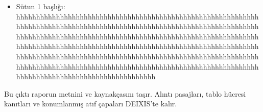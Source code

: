 \documentclass[journal]{IEEEtran}
\begin{document}
\begin{itemize}
\item[1.] Sütun 1 başlığı: hhhhhhhhhhhhhhhhhhhhhhhhhhhhhhhhhhhhhhhhhhhhhhhhhhhhhhhhhhhhhhhhhhhhhhhhhhhhhhhhhhhhhhhhhhhhhhhhhhhhhhhhhhhhhhhhhhhhhhhhhhhhhhhhhhhhhhhhhhhhhhhhhhhhhhhhhhhhhhhhhhhhhhhhhhhhhhhhhhhhhhhhhhhhhhhhhhhhhhhhhhhhhhhhhhhhhhhhhhhhhhhhhhhhhhhhhhhhhhhhhhhhhhhhhhhhhhhhhhhhhhhhhhhhhhhhhhhhhhhhhhhhhhhhhhhhhhhhhhhhhhhhhhhhhhhhhhhhhhhhhhhhhhhhhhhhhhhhhhhhhhhhhhhhhhhhhhhhhhhhhhhhhhhhhhhhhhhhhhhhhhhhhhhhhhhhhhhhhhhhh
\end{itemize}

Bu çıktı raporun metnini ve kaynakçasını taşır. Alıntı pasajları, tablo hücresi kanıtları ve konumlanmış atıf çapaları DEIXIS'te kalır.




\end{document}
